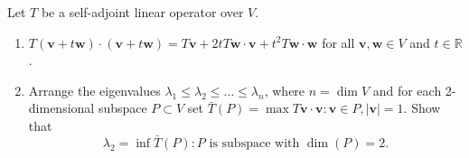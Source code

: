 \documentclass[11pt]{article}
\theoremstyle{definition}
\newenvironment{customex}[1]
  {\renewcommand\theinnercustomex{#1}\innercustomex}
  {\endinnercustomex}
\newcommand{\R}{\mathbb{R}}
\newcommand{\vv}{\mathbf{v}}
\newcommand{\vw}{\mathbf{w}}
\begin{document}
    \begin{customex}{\textbf{8}}
        Let $T$ be a self-adjoint linear operator over $V$.
        \begin{enumerate}[label = \alph*)]
            \item $T(\vv + t\vw) \cdot (\vv + t\vw) = T\vv + 2tT\vw \cdot \vv + t^2 T\vw \cdot \vw$ for all $\vv, \vw \in V$ and $t \in \R$. 
            \item Arrange the eigenvalues $\lambda_1 \le \lambda_2 \le \dots \le \lambda_n$, where $n = \dim V$ and for each 2-dimensional subspace $P \subset V$ set $\bar T(P) = \max{T\vv \cdot \vv : \vv \in P, |\vv| = 1}$. Show that
                $$\lambda_2 = \inf{\bar T(P) : P \text{ is subspace with }\dim(P) = 2}.$$
        \end{enumerate}
    \end{customex}
\end{document}
